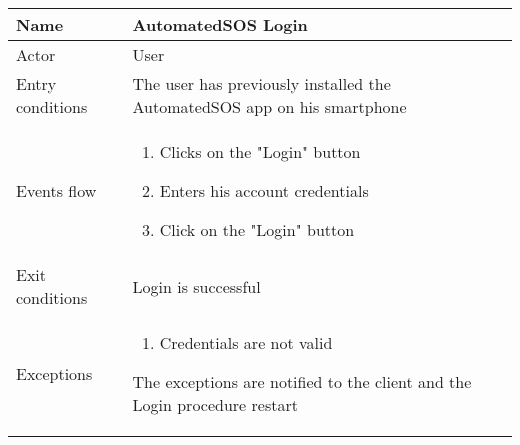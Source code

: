 \begin{table}[h!]
\begin{tabular}{|l|p{12cm}|}
\hline
Name             & AutomatedSOS Login \\ \hline
Actor            & User \\ \hline
Entry conditions & The user has previously installed the AutomatedSOS app on his smartphone \\ \hline
Events flow      & \begin{enumerate}
\item Clicks on the "Login" button
\item Enters his account credentials
\item Click on the "Login" button
\end{enumerate} \\ \hline
Exit conditions  & Login is successful\\ \hline
Exceptions       & \begin{enumerate}
\item Credentials are not valid
\end{enumerate} The exceptions are notified to the client and the Login procedure restart  \\ \hline
\end{tabular}
\end{table}

